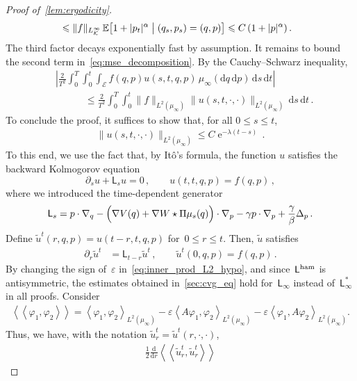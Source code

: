 \documentclass[onefignum,onetabnum]{siamart251216} %
\DeclareMathOperator{\e}{e}
\renewcommand{\d}{\mathrm{d}}
\newcommand{\expect}{\mathbb E}
\renewcommand{\leq}{\leqslant}
\newcommand{\mescin}{\mu}
\newcommand{\adj}{\mathsf{L}_\infty^*}
\newcommand{\genlin}{\mathsf{L}_\infty}
\newcommand{\Lham}{\mathsf{L}^{\rm{ham}}}
\newcommand{\slangle}[1]{\left\langle #1 \right\rangle}
\newcommand{\dblangle}[1]{\left\langle\!\left\langle #1 \right\rangle\!\right\rangle}
\newcommand{\scal}[1]{\slangle{#1}_{L^2(\mescin_\infty)}}
\newcommand{\eps}{\varepsilon}
\theoremstyle{plain}
\numberwithin{equation}{section}
\numberwithin{theorem}{section}
\begin{document}
\begin{proof}[Proof of~\cref{lem:ergodicity}]
\begin{align*}
    &\leq \|f\|_{L^{\infty}_{\mathcal K }} \, \expect\bigl[ 1 + |p_t|^{\alpha} \bigm| (q_s, p_s) = (q, p)\bigr]
    \leq C \left( 1 + |p|^{\alpha} \right).
\end{align*}
The third factor decays exponentially fast by assumption.
It remains to bound the second term in~\eqref{eq:mse_decomposition}.
By the Cauchy--Schwarz inequality,
\begin{align*}
            &\left|\frac{2}{T^2} \int_{0}^{T} \int_{0}^{t} \int_{\mathcal E}  f(q, p) u(s, t, q, p) \, \mu_{\infty}(\d q\,\d p)  \, \d s \, \d t \right| \\
        &\qquad \quad\leq \frac{2}{T^2} \int_{0}^{T} \int_{0}^{t} \lVert f \rVert_{L^2(\mu_{\infty})}
        \lVert u(s, t, \cdot, \cdot) \lVert_{L^2(\mu_{\infty})} \,  \d s \, \d t \, .
\end{align*}
To conclude the proof,
it suffices to show that, for all $0 \leq s \leq t$,
\begin{align}
    \label{eq:dec_expo_kolmog}
    \lVert u(s, t, \cdot, \cdot) \lVert_{L^2(\mu_{\infty})}
    \leq C \e^{-\lambda (t-s)} \, .
\end{align}
To this end, we use the fact that, by It\^{o}'s formula,
the function $u$ satisfies the backward Kolmogorov equation
\[
    \partial_s u + \mathsf L_s u = 0 \, , \qquad u(t, t, q, p) = f(q, p) \, ,
\]
where we introduced the time-dependent generator
\[
    \mathsf L_s = p \cdot \nabla_q - \Bigl(\nabla V(q) + \nabla W \star \Pi \mu_s (q) \Bigr) \cdot \nabla_p - \gamma p \cdot \nabla_p + \frac{\gamma}{\beta} \Delta_p \, .
\]
Define $\widetilde{u}^t(r, q, p) = u(t - r, t, q, p)$ for~$0\leq r\leq t$.
Then, $\widetilde u$ satisfies
\begin{align*}
    \partial_r \widetilde u^t
    &= \mathsf L_{t-r} \widetilde u^t \, , \qquad \widetilde u^t(0, q, p) = f(q, p) \, .
\end{align*}
By changing the sign of~$\eps$ in~\eqref{eq:inner_prod_L2_hypo}, and since~$\Lham$ is antisymmetric, the estimates obtained in~\cref{sec:cvg_eq} hold for~$\genlin$ instead of~$\adj$ in all proofs. Consider
\begin{align}
    \label{eq:inner_prod_L2_hypo_bis}
    \dblangle{\varphi_1,\varphi_2} = \scal{\varphi_1,\varphi_2} - \eps\scal{A\varphi_1,\varphi_2} - \eps\scal{\varphi_1,A\varphi_2}.
\end{align}
Thus, we have, with the notation $\widetilde u_r^t = \widetilde u^t(r, \cdot, \cdot)$,
\begin{align*}
    \frac{1}{2} \frac{\d}{\d r} \dblangle{\widetilde u_r^t, \widetilde u_r^t}

\end{align*}
\end{proof}
\end{document}
